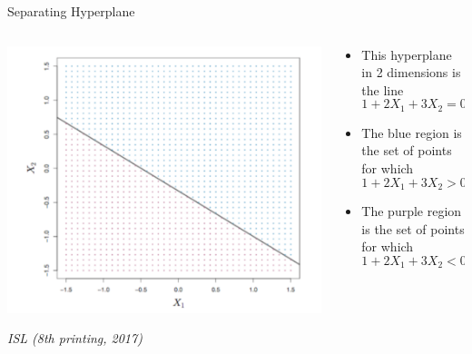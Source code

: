 \begin{frame}{Separating Hyperplane}
\begin{columns}
  \begin{column}{0.5\textwidth}
    \centering
    \includegraphics[width=\linewidth]{images/support-vector-machines/support-vector-machines-3.png}
    
    {\scriptsize\textit{ISL (8th printing, 2017)}}
  \end{column}
  \begin{column}{0.48\textwidth}
    \begin{itemize}
      \item This hyperplane in 2 dimensions is the line
      \[
        1 + 2X_1 + 3X_2 = 0
      \]
      \item The blue region is the set of points for which
      \[
        1 + 2X_1 + 3X_2 > 0
      \]
      \item The purple region is the set of points for which
      \[
        1 + 2X_1 + 3X_2 < 0
      \]
    \end{itemize}
  \end{column}
\end{columns}
\end{frame}


